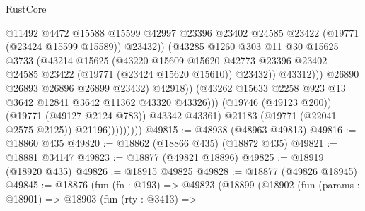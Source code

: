 \begin{lexlean}{RustCore}
\begin{coremodule}
                                          @11492
                                          @4472
                                          @15588
                                          @15599
                                          @42997
                                          @23396
                                          @23402
                                          @24585
                                          @23422
                                          (@19771 (@23424 @15599 @15589))
                                          @23432))
                                      (@43285
                                        @1260
                                        @303
                                        @11
                                        @30
                                        @15625
                                        @3733
                                        (@43214
                                          @15625
                                          (@43220
                                            @15609
                                            @15620
                                            @42773
                                            @23396
                                            @23402
                                            @24585
                                            @23422
                                            (@19771 (@23424 @15620 @15610))
                                            @23432))
                                        @43312)))
                                  @26890
                                  @26893
                                  @26896
                                  @26899
                                  @23432)
                                @42918))
                            (@43262 @15633 @2258 @923 @13 @3642 @12841 @3642 @11362 @43320 @43326)))
                        (@19746 (@49123 @200))
                        (@19771 (@49127 @2124 @783))
                        @43342
                        @43361)
                      @21183
                      (@19771 (@22041 @2575 @2125))
                      @21196)))))))))
@49815 := @48938 (@48963 @49813)
@49816 := @18860 @435
@49820 := @18862 (@18866 @435) (@18872 @435)
@49821 := @18881 @34147
@49823 := @18877 (@49821 @18896)
@49825 := @18919 (@18920 @435)
@49826 := @18915 @49825
@49828 := @18877 (@49826 @18945)
@49845 := @18876
    (fun (fn : @193) =>
    @49823
      (@18899
        (@18902
          (fun (params : @18901) =>
          @18903
            (fun (rty : @3413) =>

\end{coremodule}
\end{lexlean}

